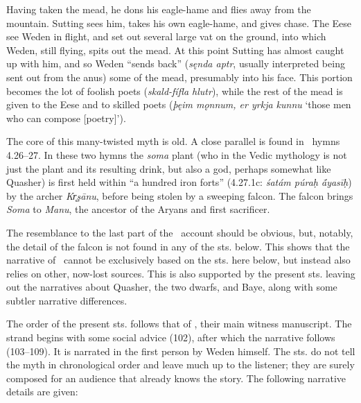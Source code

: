 Having taken the mead, he dons his eagle-hame and flies away from the mountain. Sutting sees him, takes his own eagle-hame, and gives chase. The Eese see Weden in flight, and set out several large vat on the ground, into which Weden, still flying, spits out the mead. At this point Sutting has almost caught up with him, and so Weden “sends back” (\emph{sęnda aptr}, usually interpreted being sent out from the anus) some of the mead, presumably into his face. This portion becomes the lot of foolish poets (\emph{skald-fífla hlutr}), while the rest of the mead is given to the Eese and to skilled poets (\emph{þęim mǫnnum, er yrkja kunnu} ‘those men who can compose [poetry]’).

The core of this many-twisted myth is old. A close parallel is found in \Rigveda\ hymns 4.26–27. In these two hymns the \emph{soma} plant (who in the Vedic mythology is not just the plant and its resulting drink, but also a god, perhaps somewhat like Quasher) is first held within “a hundred iron forts” (4.27.1c: \emph{śatám púraḥ ā́yasīḥ}) by the archer \emph{Kr̥şānu}, before being stolen by a sweeping falcon. The falcon brings \emph{Soma} to \emph{Manu}, the ancestor of the Aryans and first sacrificer.

The resemblance to the last part of the \Skaldskaparmal\ account should be obvious, but, notably, the detail of the falcon is not found in any of the sts. below. This shows that the narrative of \Skaldskaparmal\ cannot be exclusively based on the sts. here below, but instead also relies on other, now-lost sources. This is also supported by the present sts. leaving out the narratives about Quasher, the two dwarfs, and Baye, along with some subtler narrative differences.

The order of the present sts. follows that of \Regius, their main witness manuscript. The strand begins with some social advice (102), after which the narrative follows (103–109). It is narrated in the first person by Weden himself. The sts. do not tell the myth in chronological order and leave much up to the listener; they are surely composed for an audience that already knows the story. The following narrative details are given:

